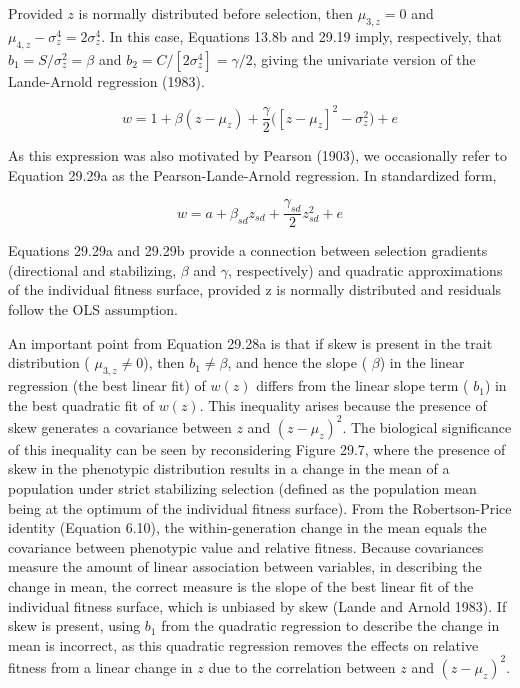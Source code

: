 \documentclass{article}
\begin{document}
Provided $z$ is normally distributed before selection, then $\mu_{3,z}=0$ and $\mu_{4,z}-\sigma_{z}^{4}=2\sigma_{z}^{4}$. In this case, Equations 13.8b and 29.19 imply, respectively, that $b_{1}=S/\sigma_{z}^{2}=\beta$ and $b_{2}=C/[2\sigma_{z}^{4}]=\gamma/2$, giving the univariate version of the Lande-Arnold regression (1983).

\begin{equation}
w=1+\beta(z-\mu_{z})+\frac{\gamma}{2}\Big([z-\mu_{z}]^{2}-\sigma_{z}^{2}\Big)+e
\tag{29.29a}
\label{eq:29_29a}
\end{equation}

As this expression was also motivated by Pearson (1903), we occasionally refer to Equation 29.29a as the Pearson-Lande-Arnold regression. In standardized form,

\begin{equation}
w=a+\beta_{sd}z_{sd}+\frac{\gamma_{sd}}{2}z_{sd}^{2}+e
\tag{29.29b}
\label{eq:29_29b}
\end{equation}

Equations 29.29a and 29.29b provide a connection between selection gradients (directional and stabilizing,  $ \beta $ and  $ \gamma $, respectively) and quadratic approximations of the individual fitness surface, provided z is normally distributed and residuals follow the OLS assumption.

An important point from Equation 29.28a is that if skew is present in the trait distribution ( $ \mu_{3,z} \neq 0 $), then  $ b_1 \neq \beta $, and hence the slope ( $ \beta $) in the linear regression (the best linear fit) of  $ w(z) $ differs from the linear slope term ( $ b_1 $) in the best quadratic fit of  $ w(z) $. This inequality arises because the presence of skew generates a covariance between  $ z $ and  $ (z - \mu_z)^2 $. The biological significance of this inequality can be seen by reconsidering Figure 29.7, where the presence of skew in the phenotypic distribution results in a change in the mean of a population under strict stabilizing selection (defined as the population mean being at the optimum of the individual fitness surface). From the Robertson-Price identity (Equation 6.10), the within-generation change in the mean equals the covariance between phenotypic value and relative fitness. Because covariances measure the amount of linear association between variables, in describing the change in mean, the correct measure is the slope of the best linear fit of the individual fitness surface, which is unbiased by skew (Lande and Arnold 1983). If skew is present, using  $ b_1 $ from the quadratic regression to describe the change in mean is incorrect, as this quadratic regression removes the effects on relative fitness from a linear change in  $ z $ due to the correlation between  $ z $ and  $ (z - \mu_z)^2 $.
\end{document}
